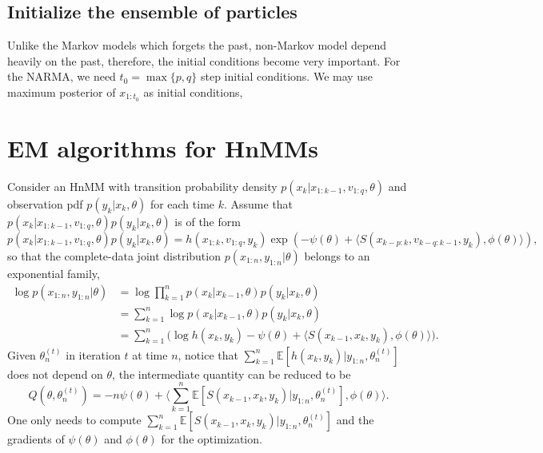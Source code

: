 \documentclass[12pt]{article}
\newcommand{\Ebr}[1]{\mathbb{E}\left[{#1}\right]}
\newcommand{\innerp}[1]{\langle{#1}\rangle}
\numberwithin{equation}{section}
\numberwithin{theorem}{section}
\begin{document}
\subsection{Initialize the ensemble of particles}
Unlike the Markov models which forgets the past, non-Markov model depend heavily on the past, therefore, the initial conditions become very important. For the NARMA, we need $t_0=\max\{p,q\}$ step initial conditions. We may use maximum posterior of $x_{1:t_0}$ as initial conditions, 

\section{EM algorithms for HnMMs}
Consider an HnMM with transition probability density $p(x_k|x_{1:k-1},v_{1:q},\theta)$ and observation pdf $p(y_k|x_k,\theta)$ for each time $k$. Assume that  $p(x_k|x_{1:k-1},v_{1:q},\theta)p(y_k|x_k,\theta)$ is of the form 
 \[p(x_k|x_{1:k-1},v_{1:q},\theta)p(y_k|x_k,\theta)=h(x_{1:k},v_{1:q},y_k)\exp(-\psi(\theta)+\langle S(x_{k-p:k},v_{k-q:k-1},y_k),\phi(\theta)\rangle),\]
 so that the complete-data joint distribution $p(x_{1:n},y_{1:n}|\theta)$ belongs to an exponential family, 
 \begin{align*}
 \log p(x_{1:n},y_{1:n}|\theta)&=\log\prod_{k=1}^np(x_k|x_{k-1},\theta)p(y_k|x_k,\theta)\\
 &=\sum_{k=1}^n \log p(x_k|x_{k-1},\theta)p(y_k|x_k,\theta)\\
 &=\sum_{k=1}^n \Big(\log h(x_k,y_k)-\psi(\theta)+\langle S(x_{k-1},x_k,y_k),\phi(\theta)\rangle\Big).
  \end{align*}
Given $\theta^{(t)}_n$ in iteration $t$ at time  $n$, notice that $\sum_{k=1}^n\Ebr{ h(x_k,y_k)|y_{1:n},\theta^{(t)}_n}$ does not depend on $\theta$, the intermediate quantity can be reduced to be
\[
Q(\theta,\theta^{(t)}_n)=-n\psi(\theta)+\innerp{ \sum_{k=1}^n\Ebr{S(x_{k-1},x_k,y_k)|y_{1:n},\theta^{(t)}_n},\phi(\theta) }.
\]  
One only needs to compute $\sum_{k=1}^n\Ebr{ S(x_{k-1},x_k,y_k)|y_{1:n},\theta^{(t)}_n}$ and the gradients of $\psi(\theta)$ and $\phi(\theta)$ for the optimization. 
\end{document}
